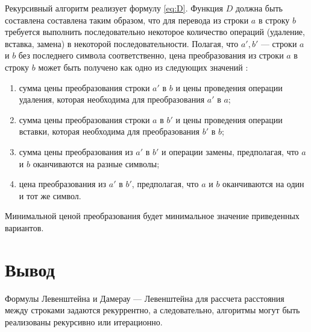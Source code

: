 Рекурсивный алгоритм реализует формулу \ref{eq:D}.
Функция $D$ должна быть составлена составлена таким образом, что для перевода из строки $a$ в строку $b$ требуется выполнить последовательно некоторое количество операций (удаление, вставка, замена) в некоторой последовательности. Полагая, что $a', b'$  — строки $a$ и $b$ без последнего символа соответственно, цена преобразования из строки $a$ в строку $b$ может быть получено как одно из следующих значений :
\begin{enumerate}[label={\arabic*)}]
	\item сумма цены преобразования строки $a'$ в $b$ и цены проведения операции удаления, которая необходима для преобразования $a'$ в $a$;
	\item сумма цены преобразования строки $a$ в $b'$  и цены проведения операции вставки, которая необходима для преобразования $b'$ в $b$;
	\item сумма цены преобразования из $a'$ в $b'$ и операции замены, предполагая, что $a$ и $b$ оканчиваются на разные символы;
	\item цена преобразования из $a'$ в $b'$, предполагая, что $a$ и $b$ оканчиваются на один и тот же символ.
\end{enumerate}

Минимальной ценой преобразования будет минимальное значение приведенных вариантов.



\section*{Вывод}

Формулы Левенштейна и Дамерау — Левенштейна для рассчета расстояния между строками задаются рекуррентно, а следовательно, алгоритмы могут быть реализованы рекурсивно или итерационно.


